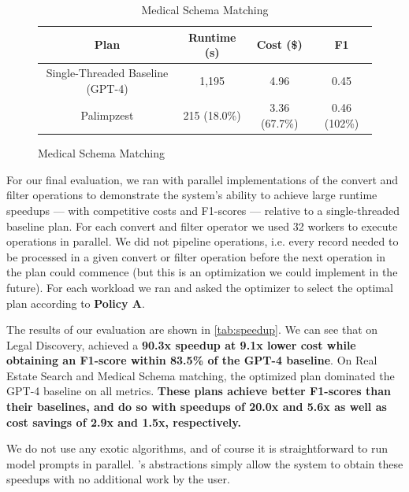 \begin{table}[h!]
    \begin{subfigure}{\textwidth}
        \caption{Medical Schema Matching}
        \vspace{-4pt}
        \renewcommand{\arraystretch}{1.3}
        \centering
        \begin{tabular}{|c|c|c|c|}
        \hline
        {\bf Plan } & {\bf Runtime (s)} & {\bf Cost (\$)} & {\bf F1}\\
        \hline
        Single-Threaded Baseline (GPT-4) & 1,195 & 4.96 & 0.45 \\
        \hline
        Palimpzest & 215 (18.0\%) & 3.36 (67.7\%) & 0.46 (102\%) \\
        \hline
        \end{tabular}
        \label{table:speedup-medical}
    \end{subfigure}
    \label{tab:speedup}
\end{table}




For our final evaluation, we ran \system{} with parallel implementations of the convert and filter operations to demonstrate the system's ability to achieve large runtime speedups --- with competitive costs and F1-scores --- relative to a single-threaded baseline plan. For each convert and filter operator we used 32 workers to execute operations in parallel. We did not pipeline operations, i.e. every record needed to be processed in a given convert or filter operation before the next operation in the plan could commence (but this is an optimization we could implement in the future). For each workload we ran \system{} and asked the optimizer to select the optimal plan according to {\bf Policy A}.

The results of our evaluation are shown in \autoref{tab:speedup}. We can see that on Legal Discovery, \system{} achieved a {\bf 90.3x speedup at 9.1x lower cost while obtaining an F1-score within 83.5\% of the GPT-4 baseline}. On Real Estate Search and Medical Schema matching, the optimized plan dominated the GPT-4 baseline on all metrics. {\bf These plans achieve better F1-scores than their baselines, and do so with speedups of 20.0x and 5.6x as well as cost savings of 2.9x and 1.5x, respectively.}

We do not use any exotic algorithms, and of course it is straightforward to run model prompts in parallel.  \system's abstractions simply allow the system to obtain these speedups with no additional work by the user.

